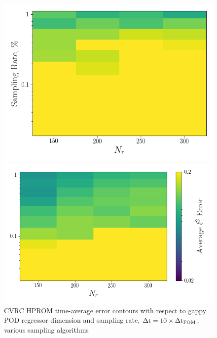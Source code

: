\begin{figure}
	\begin{minipage}{0.46\linewidth}
		\includegraphics[width=0.99\linewidth]{Chapters/CavityAndCVRC/Images/cvrc/deim/err_contour_gnat1_dt1e-6.png}
	\end{minipage}
	\begin{minipage}{0.53\linewidth}
		\includegraphics[width=0.99\linewidth]{Chapters/CavityAndCVRC/Images/cvrc/deim/err_contour_gnat2_dt1e-6.png}
	\end{minipage}
	\caption{CVRC HPROM time-average error contours with respect to gappy POD regressor dimension and sampling rate, $\Delta \text{t} = 10 \times \Delta \text{t}_{\text{FOM}}$, various sampling algorithms}
\end{figure}


